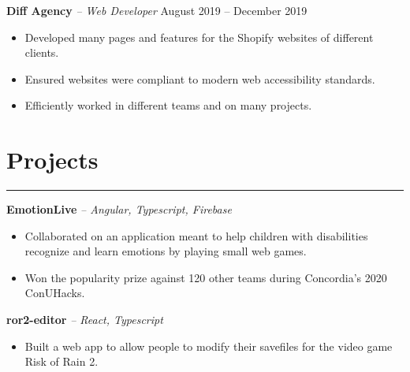 \documentclass[11pt]{article}
\let\origsection\section
\renewcommand{\section}[2]{
    \origsection*{\LARGE \color{#2}#1} \hrule
}
\renewcommand{\subsection}[4]{
    \textcolor{#4}{\large \textbf{#1} \textit{-- #2} \hfill {#3}}
}
\begin{document}
\subsection{Diff Agency}{Web Developer}{August 2019 -- December 2019}{blacker}
\begin{itemize}[noitemsep]
    \item Developed many pages and features for the Shopify websites of different clients.
    \item Ensured websites were compliant to modern web accessibility standards.
    \item Efficiently worked in different teams and on many projects.
\end{itemize}

\section{Projects}{blacker}
\subsection{EmotionLive}{Angular, Typescript, Firebase}{}{blacker}
\begin{itemize}[noitemsep]
    \item Collaborated on an application meant to help children with disabilities recognize and learn emotions by playing small web games. 
    \item Won the popularity prize against 120 other teams during Concordia's 2020 ConUHacks.
\end{itemize}

\subsection{ror2-editor}{React, Typescript}{}{blacker}
\begin{itemize}[noitemsep]
    \item Built a web app to allow people to modify their savefiles for the video game Risk of Rain 2.
\end{itemize}

\end{document}
